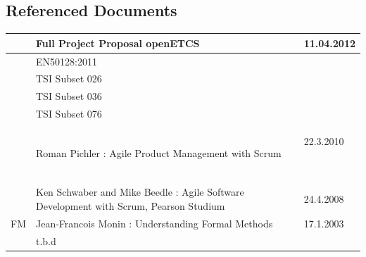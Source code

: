 \documentclass{template/openetcs_article}
\begin{document}
\subsection{Referenced Documents}
\begin{center}
\tabletail{}
\tablelasttail{}
\begin{supertabular}{|m{2cm}|m{9cm}|m{3cm}|}
\hline
\centering [D01] &
Full Project Proposal openETCS &
11.04.2012\\\hline
\centering [D02] &
EN50128:2011 &
~
\\\hline
\centering [D03] &
TSI Subset 026 &
~
\\\hline
\centering [D04] &
TSI Subset 036 &
~
\\\hline
\centering [D05] &
TSI Subset 076 &
~
\\\hline
[SCRUM] &
Roman Pichler : Agile Product Management with Scrum &
22.3.2010

~
\\\hline
[SCRUM] &
Ken Schwaber and Mike Beedle : Agile Software Development with Scrum, Pearson Studium &
24.4.2008\\\hline
\centering FM &
Jean-Francois Monin : Understanding Formal Methods


&
17.1.2003\\\hline
\centering [ECLIPSE] &
t.b.d &
~
\\\hline
\end{supertabular}
\end{center}
\end{document}

